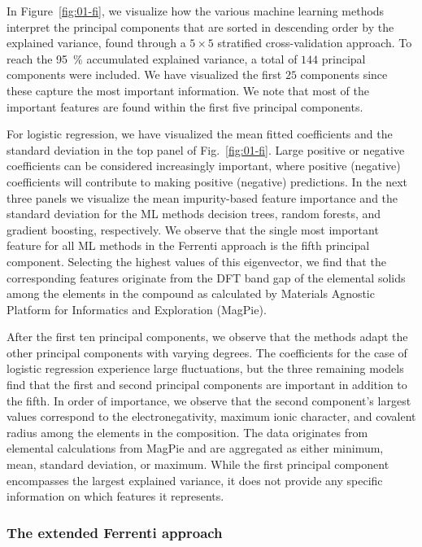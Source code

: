 \documentclass[superscriptaddress,unsortedaddress,
 amsmath,amssymb,
 aps,
]{revtex4-2}
\begin{document}
In Figure~\ref{fig:01-fi}, we visualize how the various machine learning methods  interpret the principal components that are sorted in descending order by the explained variance, found through a $5\times 5$ stratified cross-validation approach. To reach the \SI{95}{\percent} accumulated explained variance, a total of $144$ principal components were included. We have visualized the first $25$ components since these capture the most important information. We note that most of the important features are found within the first five principal components.



For logistic regression, we have visualized the mean fitted coefficients and the standard deviation in the top panel of Fig.~\ref{fig:01-fi}. Large positive or negative coefficients can be considered increasingly important, where positive (negative) coefficients will contribute to making positive (negative) predictions. In the next three panels we visualize the mean impurity-based feature importance and the standard deviation for the ML methods decision trees, random forests, and gradient boosting, respectively. We observe that the single most important feature for all ML methods in the Ferrenti approach is the fifth principal component. Selecting the highest values of this eigenvector, we find that the corresponding features originate from the DFT band gap of the elemental solids among the elements in the compound as calculated by Materials Agnostic Platform for Informatics and Exploration (MagPie). 

After the first ten principal components, we observe that the methods adapt the other principal components with varying degrees. The coefficients for the case of logistic regression experience large fluctuations, but the three remaining models find that the first and second principal components are important in addition to the fifth. In order of importance, we observe that the second component's largest values correspond to the electronegativity, maximum ionic character, and covalent radius among the elements in the composition. The data originates from elemental calculations from MagPie and are aggregated as either minimum, mean, standard deviation, or maximum. While the first principal component encompasses the largest explained variance, it does not provide any specific information on which features it represents.


\subsubsection*{The extended Ferrenti approach}
\end{document}
